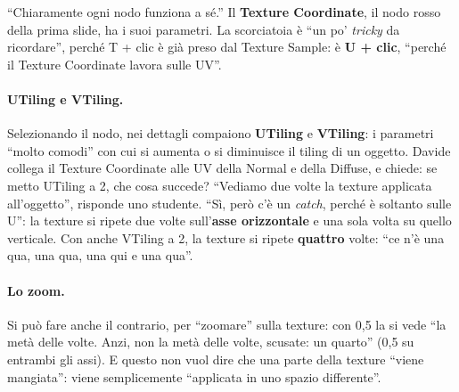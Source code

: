 ``Chiaramente ogni nodo funziona a sé.'' Il \textbf{Texture Coordinate}, il nodo rosso
della prima slide, ha i suoi parametri. La scorciatoia è ``un po' \emph{tricky} da
ricordare'', perché T + clic è già preso dal Texture Sample: è \textbf{U + clic},
``perché il Texture Coordinate lavora sulle UV''.

\paragraph{UTiling e VTiling.} Selezionando il nodo, nei dettagli compaiono
\textbf{UTiling} e \textbf{VTiling}: i parametri ``molto comodi'' con cui si aumenta o
si diminuisce il tiling di un oggetto. Davide collega il Texture Coordinate alle UV
della Normal e della Diffuse, e chiede: se metto UTiling a 2, che cosa succede? ``Vediamo
due volte la texture applicata all'oggetto'', risponde uno studente. ``Sì, però c'è un
\emph{catch}, perché è soltanto sulle U'': la texture si ripete due volte
sull'\textbf{asse orizzontale} e una sola volta su quello verticale. Con anche VTiling a
2, la texture si ripete \textbf{quattro} volte: ``ce n'è una qua, una qua, una qui e una
qua''.

\paragraph{Lo zoom.} Si può fare anche il contrario, per ``zoomare'' sulla texture: con
0,5 la si vede ``la metà delle volte. Anzi, non la metà delle volte, scusate: un
quarto'' (0,5 su entrambi gli assi). E questo non vuol dire che una parte della
texture ``viene mangiata'': viene semplicemente ``applicata in uno spazio differente''.

